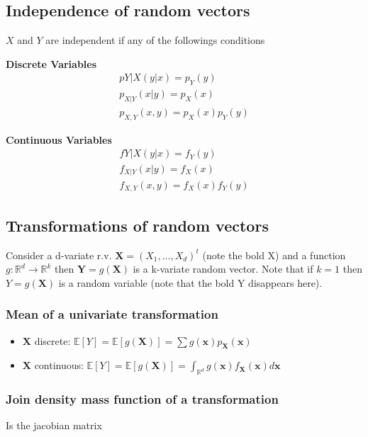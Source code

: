 \subsection{Independence of random vectors}
$X$ and $Y$ are independent if any of the followings conditions
\setlength{\columnseprule}{1pt}
\begin{multicols}{2}
    \textbf{Discrete Variables} \begin{multline*} 
        p{Y|X}(y|x)=p_Y(y)\\
        p_{X|Y}(x|y)=p_X(x)\\
        p_{X,Y}(x,y)=p_X(x)p_Y(y)
    \end{multline*}

    \textbf{Continuous Variables} \begin{multline*}
        f{Y|X}(y|x)=f_Y(y)\\
        f_{X|Y}(x|y)=f_X(x)\\
        f_{X,Y}(x,y)=f_X(x)f_Y(y)
    \end{multline*}
\end{multicols}

\subsection{Transformations of random vectors}
Consider a d-variate r.v. $\textbf{X}=(X_1,\dots,X_d)^t$ (note the bold X) and a
function $g:\mathbb{R}^d \rightarrow \mathbb{R}^k$ then
$\textbf{Y}=g(\textbf{X})$ is a k-variate random vector. Note that if $k=1$ then
$Y=g(\textbf{X})$ is a random variable (note that the bold Y disappears here).
\subsubsection{Mean of a univariate transformation}
\begin{itemize}
    \item $\textbf{X}$ discrete: $\mathbb{E}[Y]=\mathbb{E}[g(\textbf{X})]=\sum
    g(\textbf{x})p_\textbf{X}(\textbf{x})$
    \item $\textbf{X}$ continuous:
    $\mathbb{E}[Y]=\mathbb{E}[g(\textbf{X})]=\int_{\mathbb{R}^d}
    g(\textbf{x})f_\textbf{X}(\textbf{x})d\textbf{x}$
\end{itemize}
\subsubsection{Join density mass function of a transformation}
Is the jacobian matrix

